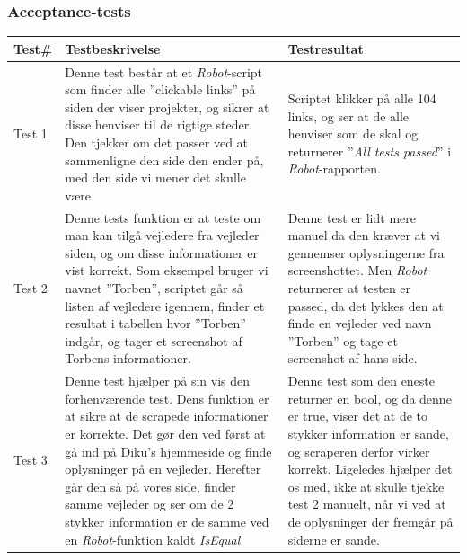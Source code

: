 \documentclass[12pt]{article}
\begin{document}
\subsubsection*{Acceptance-tests}
\begin{center}
	\begin{tabular}{|p{}|p{}|p{}|}
		\hline
	\textbf{Test\#} & \textbf{Testbeskrivelse} & \textbf{Testresultat} \\ \hline

	Test 1 & Denne test består at et \textit{Robot}-script som finder alle ''clickable links'' på siden der viser projekter, og sikrer at disse henviser til de rigtige steder. Den tjekker om det passer ved at sammenligne den side den ender på, med den side vi mener det skulle være & Scriptet klikker på alle 104 links, og ser at de alle henviser som de skal og returnerer ''\textit{All tests passed}'' i \textit{Robot}-rapporten.  \\ \hline

	Test 2 & Denne tests funktion er at teste om man kan tilgå vejledere fra vejleder siden, og om disse informationer er vist korrekt. Som eksempel bruger vi navnet ''Torben'', scriptet går så listen af vejledere igennem, finder et resultat i tabellen hvor ''Torben'' indgår, og tager et screenshot af Torbens informationer. & Denne test er lidt mere manuel da den kræver at vi gennemser oplysningerne fra screenshottet. Men \textit{Robot} returnerer at testen er passed, da det lykkes den at finde en vejleder ved navn ''Torben'' og tage et screenshot af hans side.\\ \hline

	Test 3 & Denne test hjælper på sin vis den forhenværende test. Dens funktion er at sikre at de scrapede informationer er korrekte. Det gør den ved først at gå ind på Diku's hjemmeside og finde oplysninger på en vejleder. Herefter går den så på vores side, finder samme vejleder og ser om de 2 stykker information er de samme ved en \textit{Robot}-funktion kaldt \textit{IsEqual} & Denne test som den eneste returner en bool, og da denne er true, viser det at de to stykker information er sande, og scraperen derfor virker korrekt. \newline
	Ligeledes hjælper det os med, ikke at skulle tjekke test 2 manuelt, når vi ved at de oplysninger der fremgår på siderne er sande. \\ \hline
	\end{tabular}
\end{center}
\newpage
\end{document}
